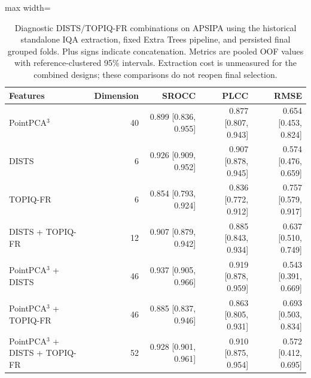 \begin{table}[t!]
\centering
\caption{Diagnostic DISTS/TOPIQ-FR combinations on APSIPA using the historical standalone IQA extraction, fixed Extra Trees pipeline, and persisted final grouped folds. Plus signs indicate concatenation. Metrics are pooled OOF values with reference-clustered 95\% intervals. Extraction cost is unmeasured for the combined designs; these comparisons do not reopen final selection.}
\label{tab_review_iqa_complementarity}
\scriptsize
\begin{adjustbox}{max width=\textwidth}
\begin{tabular}{lrrrr}
\toprule
Features & Dimension & SROCC & PLCC & RMSE \\
\midrule
PointPCA$^3$ & 40 & 0.899 [0.836, 0.955] & 0.877 [0.807, 0.943] & 0.654 [0.453, 0.824] \\
DISTS & 6 & 0.926 [0.909, 0.952] & 0.907 [0.878, 0.945] & 0.574 [0.476, 0.659] \\
TOPIQ-FR & 6 & 0.854 [0.793, 0.924] & 0.836 [0.772, 0.912] & 0.757 [0.579, 0.917] \\
DISTS + TOPIQ-FR & 12 & 0.907 [0.879, 0.942] & 0.885 [0.843, 0.934] & 0.637 [0.510, 0.749] \\
PointPCA$^3$ + DISTS & 46 & 0.937 [0.905, 0.966] & 0.919 [0.878, 0.959] & 0.543 [0.391, 0.669] \\
PointPCA$^3$ + TOPIQ-FR & 46 & 0.885 [0.837, 0.946] & 0.863 [0.805, 0.931] & 0.693 [0.503, 0.834] \\
PointPCA$^3$ + DISTS + TOPIQ-FR & 52 & 0.928 [0.901, 0.961] & 0.910 [0.875, 0.954] & 0.572 [0.412, 0.695] \\
\bottomrule
\end{tabular}
\end{adjustbox}
\end{table}
